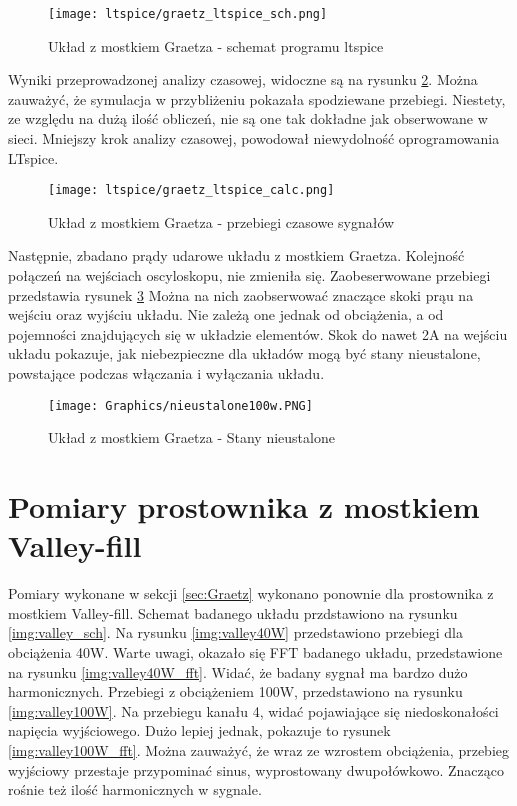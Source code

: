 \begin{figure}[H]
    \centering
    \texttt{[image: ltspice/graetz\_ltspice\_sch.png]}
    \caption{Układ z mostkiem Graetza - schemat programu ltspice}
    \label{img:graetz_ltspice_sch}
\end{figure}

Wyniki przeprowadzonej analizy czasowej, widoczne są na rysunku \ref{img:graetz_ltspice_calc}. Można zauważyć, że symulacja w przybliżeniu pokazała spodziewane przebiegi. Niestety, ze względu na dużą ilość obliczeń, nie są one tak dokładne jak obserwowane w sieci. Mniejszy krok analizy czasowej, powodował niewydolność oprogramowania LTspice. \newline

\begin{figure}[H]
    \centering
    \texttt{[image: ltspice/graetz\_ltspice\_calc.png]}
    \caption{Układ z mostkiem Graetza - przebiegi czasowe sygnałów}
    \label{img:graetz_ltspice_calc}
\end{figure}

Następnie, zbadano prądy udarowe układu z mostkiem Graetza. Kolejność połączeń na wejściach oscyloskopu, nie zmieniła się. Zaobeserwowane przebiegi przedstawia rysunek \ref{img:nieustalone100W}
Można na nich zaobserwować znaczące skoki prąu na wejściu oraz wyjściu układu. Nie zależą one jednak od obciążenia, a od pojemności znajdujących się w układzie elementów. Skok do nawet 2A na wejściu układu pokazuje, jak niebezpieczne dla układów mogą być stany nieustalone, powstające podczas włączania i wyłączania układu.

\begin{figure}[H]
    \centering
    \texttt{[image: Graphics/nieustalone100w.PNG]}
    \caption{Układ z mostkiem Graetza - Stany nieustalone}
    \label{img:nieustalone100W}
\end{figure}
\section{Pomiary prostownika z mostkiem Valley-fill}
Pomiary wykonane w sekcji \ref{sec:Graetz} wykonano ponownie dla prostownika z mostkiem Valley-fill. Schemat badanego układu przdstawiono na rysunku \ref{img:valley_sch}. Na rysunku \ref{img:valley40W} przedstawiono przebiegi dla obciążenia 40W. Warte uwagi, okazało się FFT badanego układu, przedstawione na rysunku \ref{img:valley40W_fft}. Widać, że badany sygnał ma bardzo dużo harmonicznych. Przebiegi z obciążeniem 100W, przedstawiono na rysunku \ref{img:valley100W}. Na przebiegu kanału 4, widać pojawiające się niedoskonałości napięcia wyjściowego. Dużo lepiej jednak, pokazuje to rysunek \ref{img:valley100W_fft}. Można zauważyć, że wraz ze wzrostem obciążenia, przebieg wyjściowy przestaje przypominać sinus, wyprostowany dwupołówkowo. Znacząco rośnie też ilość harmonicznych w sygnale.

